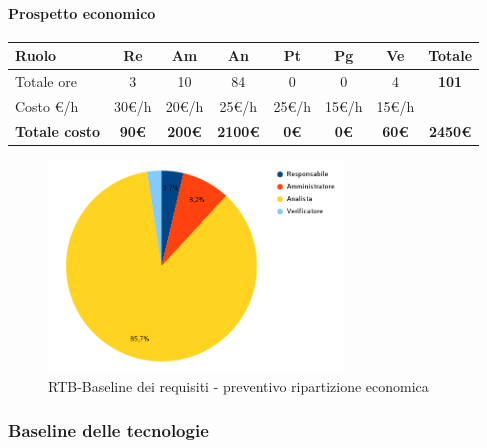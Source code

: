 \paragraph{Prospetto economico}
\begin{center}
	\renewcommand{\arraystretch}{1.8} %
	\begin{tabular}{ |m{10em}|c|c|c|c|c|c|c| }
	\hline
	\textbf{Ruolo} & \textbf{Re} & \textbf{Am} &  \textbf{An} &  \textbf{Pt} &  \textbf{Pg} &  \textbf{Ve} &  \textbf{Totale}\\
    \hline
    Totale ore & 3 & 10 & 84 & 0 & 0 & 4 & \textbf{101}\\
    \hline
    Costo \euro/h & 30\euro/h & 20\euro/h & 25\euro/h & 25\euro/h & 15\euro/h & 15\euro/h & \\
    \hline
    \textbf{Totale costo} & \textbf{90\euro} & \textbf{200\euro} &  \textbf{2100\euro} &  \textbf{0\euro} &  \textbf{0\euro} &  \textbf{60\euro} &  \textbf{2450\euro}\\
    \hline
	\end{tabular}

    \begin{figure}[H]
        \centering\includegraphics[width=0.7\textwidth, height=0.7\textheight, keepaspectratio]{images/preventivo/RTB-requisiti-costo.png}
        \caption{RTB-Baseline dei requisiti - preventivo ripartizione economica}
    \end{figure}
    
\end{center}

\subsubsection{Baseline delle tecnologie}
